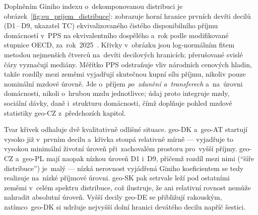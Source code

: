Doplněním Giniho indexu o~dekomponovanou distribuci je obrázek~\ref{fig:eu_prijem_distribuce}: zobrazuje horní hranice prvních devíti decilů (D1\,--\,D9, ukazatel TC) ekvivalizovaného čistého disponibilního příjmu domácností v~\acs{PPS} na ekvivalentního dospělého a~rok podle modifikované stupnice \acs{OECD}, za~rok~2025~\cite{eurostat_ilc_di01}.
Křivky v~obrázku jsou log-normálním fitem metodou nejmenších čtverců na~devíti decilových hranicích; přerušované svislé čáry vyznačují mediány.
Měřítko PPS odstraňuje vliv národních cenových hladin, takže rozdíly mezi zeměmi vyjadřují skutečnou kupní sílu příjmu, nikoliv pouze nominální mzdové úrovně.
Jde o~příjem \emph{po~zdanění a~transferech} a~na~úrovni domácnosti, nikoli o~hrubou mzdu jednotlivce; údaj proto integruje mzdy, sociální dávky, daně i~strukturu domácnosti, čímž doplňuje pohled mzdové statistiky \acs{geo-CZ} z~předchozích kapitol.

Tvar křivek odhaluje dvě kvalitativně odlišné situace.
\acs{geo-DK} a~\acs{geo-AT} startují vysoko již v~prvním decilu a~křivka stoupá relativně mírně --- vyjadřuje to vysokou minimální životní úroveň při~zachovalém prostoru pro~vyšší příjmy.
\acs{geo-CZ} a~\acs{geo-PL} mají naopak nízkou úroveň D1 i~D9, přičemž rozdíl mezi nimi (\enquote{šíře distribuce}) je~malý --- nízká nerovnost vyjádřená Giniho koeficientem se tedy realizuje na~nízké příjmové úrovni.
\acs{geo-SK} pak setrvale leží pod ostatními zeměmi v~celém spektru distribuce, což ilustruje, že ani relativní rovnost nemůže nahradit absolutní úroveň.
Vyšší decily \acs{geo-DE} se přibližují rakouským, zatímco~\acs{geo-DK} si udržuje nejvyšší dolní hranici devátého decilu napříč šestici.


